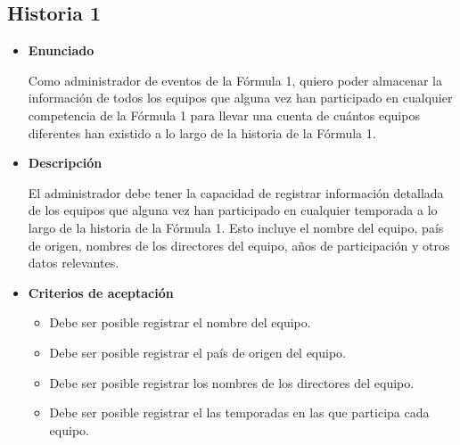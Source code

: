 \documentclass{article}
\begin{document}
	\subsection{Historia 1}
		\begin{itemize}
			
			\item \large{\textbf{Enunciado}}
			\begin{description}
				Como administrador de eventos de la Fórmula 1, quiero poder almacenar la información de todos los equipos que alguna vez han participado en cualquier competencia de la Fórmula 1 para llevar una cuenta de cuántos equipos diferentes han existido a lo largo de la historia de la Fórmula 1.
			\end{description}
			
			\item \large{\textbf{Descripción}}
			\begin{description}
				El administrador debe tener la capacidad de registrar información detallada de los equipos que alguna vez han participado en cualquier temporada a lo largo de la historia de la Fórmula 1. Esto incluye el nombre del equipo, país de origen, nombres de los directores del equipo, años de participación y otros datos relevantes.
				
			\end{description}
			
			\item \large{\textbf{Criterios de aceptación}}
			\begin{itemize}
				\item Debe ser posible registrar el nombre del equipo.
				\item Debe ser posible registrar el país de origen del equipo.
				\item Debe ser posible registrar los nombres de los directores del equipo. 
				\item Debe ser posible registrar el las temporadas en las que participa cada equipo.
			\end{itemize}
			
		\end{itemize}
	
\end{document}
